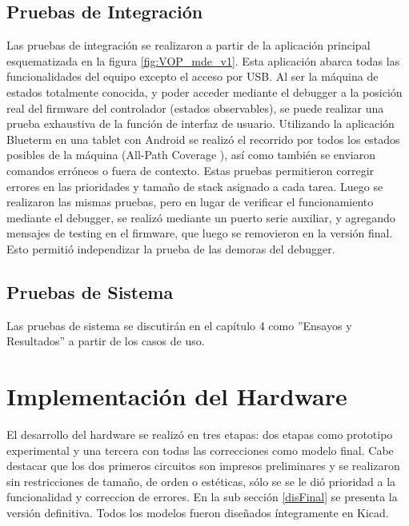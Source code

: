 \subsection{Pruebas de Integración} \label{pruebasIntegracion}

Las pruebas de integración se realizaron a partir de la aplicación principal esquematizada en la figura \ref{fig:VOP_mde_v1}. Esta aplicación abarca todas las funcionalidades del equipo excepto el acceso por USB. Al ser la máquina de estados totalmente conocida, y poder acceder mediante el debugger a la posición real del firmware del controlador (estados observables), se puede realizar una prueba exhaustiva de la función de interfaz de usuario. 
Utilizando la aplicación Blueterm en una tablet con Android se realizó el recorrido por todos los estados posibles de la máquina (All-Path Coverage \citep{lin2013}), así como también se enviaron comandos erróneos o fuera de contexto. Estas pruebas permitieron corregir errores en las prioridades y tamaño de stack asignado a cada tarea.
Luego se realizaron las mismas pruebas, pero en lugar de verificar el funcionamiento mediante el debugger, se realizó mediante un puerto serie auxiliar, y agregando mensajes de testing en el firmware, que luego se removieron en la versión final. Esto permitió independizar la prueba de las demoras del debugger.


\subsection{Pruebas de Sistema} \label{pruebasSistema}

Las pruebas de sistema se discutirán en el capítulo 4 como ''Ensayos y Resultados'' a partir de los casos de uso.

\section{Implementación del Hardware} \label{implementacionHw}

El desarrollo del hardware se realizó en tres etapas: dos etapas como prototipo experimental y una tercera con todas las correcciones como modelo final. Cabe destacar que los dos primeros circuitos son impresos preliminares y se realizaron sin restricciones de tamaño, de orden o estéticas, sólo se se le dió prioridad a la funcionalidad y correccion de errores. En la sub sección \ref{disFinal} se presenta la versión definitiva. Todos los modelos fueron diseñados íntegramente en Kicad.

